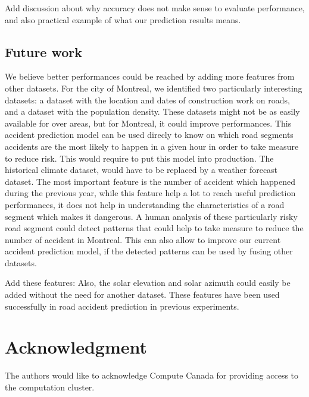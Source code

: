 \documentclass[conference]{IEEEtran}
\begin{document}
Add discussion about why accuracy does not make sense to evaluate performance, and also practical example of what our prediction results means.

\subsection{Future work}
We believe better performances could be reached by adding more features from other datasets. For the city of Montreal, we identified two particularly interesting datasets: a dataset with the location and dates of construction work on roads, and a dataset with the population density. These datasets might not be as easily available for over areas, but for Montreal, it could improve performances. This accident prediction model can be used direcly to know on which road segments accidents are the most likely to happen in a given hour in order to take measure to reduce risk. This would require to put this model into production. The historical climate dataset, would have to be replaced by a weather forecast dataset. The most important feature is the number of accident which happened during the previous year, while this feature help a lot to reach useful prediction performances, it does not help in understanding the characteristics of a road segment which makes it dangerous. A human analysis of these particularly risky road segment could detect patterns that could help to take measure to reduce the number of accident in Montreal. This can also allow to improve our current accident prediction model, if the detected patterns can be used by fusing other datasets.

Add these features:
Also, the solar elevation and solar azimuth could easily be added without the need for another dataset. These features have been used successfully in road accident prediction in previous experiments.

\section*{Acknowledgment}

The authors would like to acknowledge Compute Canada for providing access to the computation cluster.



\end{document}
